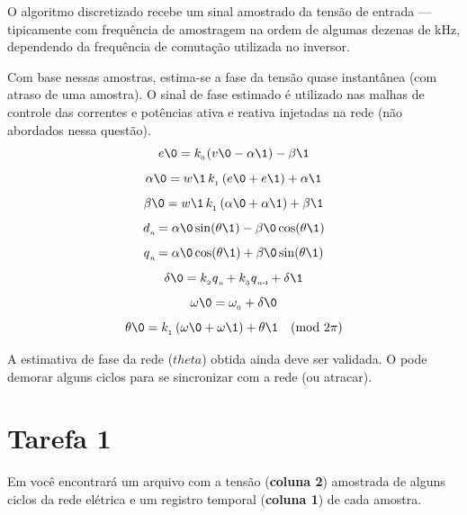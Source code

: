O algoritmo discretizado recebe um sinal amostrado da tensão de entrada --- tipicamente com frequência de amostragem
na ordem de algumas dezenas de kHz, dependendo da frequência de comutação utilizada no inversor.

Com base nessas amostras, estima-se a fase da tensão quase instantânea (com atraso de uma amostra).
O sinal de fase estimado é utilizado nas malhas de controle das correntes e potências ativa e reativa injetadas na rede
(não abordados nessa questão).
\begin{equation}\label{eq:0}
        e\0 = k_{_0\!} \left( v\0 - \alpha\1 \right)  - \beta\1
\end{equation}
\begin{equation}\label{eq:1}
    \alpha\0 = w\1  \, k_{_1}  \left( e\0 + e\1 \right)  + \alpha\1
\end{equation}
\begin{equation}\label{eq:2}
    \beta\0 = w\1  \, k_{_1}  \left( \alpha\0 + \alpha\1 \right)  + \beta\1
\end{equation}
\begin{equation}\label{eq:3a}
    d{_{_{ n\!}}} =  \alpha\0 \sin(\theta\1) - \beta\0  \cos(\theta\1)
\end{equation}
\begin{equation}\label{eq:3b}
    q{_{_{ n\!}}} =  \alpha\0 \cos(\theta\1) + \beta\0  \sin(\theta\1)
\end{equation}
\begin{equation}\label{eq:4}
    \delta\0 = k_{_2} q{_{_{ n\!}}} + k_{_3} q{_{_{ n\text{-}\!\>\!1\!}}} + \delta\1
\end{equation}
\begin{equation}\label{eq:5}
    \omega\0  = \omega_{_0} + \delta\0
\end{equation}
\begin{equation}\label{eq:6}
    \theta\0 = k_{_1}  \left( \omega\0 + \omega\1 \right)  + \theta\1    \ \ \  (\text{mod}~2\pi)
\end{equation}

A estimativa de fase da rede ($theta$) obtida ainda deve ser validada.
O  pode demorar alguns ciclos para se sincronizar com a rede (ou atracar).


\section*{Tarefa 1}
Em  você encontrará um arquivo  com a
tensão (\textbf{coluna 2}) amostrada de alguns ciclos da rede elétrica e um registro temporal (\textbf{coluna 1}) de cada amostra.


